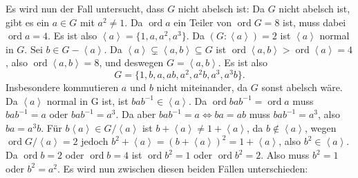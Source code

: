 \documentclass[a4paper,10pt]{article}
\theoremstyle{definition}
\newcommand{\ord}{\operatorname{ord}}
\newcommand{\gen}[1]{\left\langle#1\right\rangle}
\begin{document}
Es wird nun der Fall untersucht, dass $G$ nicht abelsch ist: Da $G$ nicht abelsch ist, gibt es ein $a \in G$ mit $a^2 \neq 1$. Da $\ord a$ ein Teiler von $\ord G = 8$ ist, muss dabei $\ord a = 4$. Es ist also $\gen{a} = \{1, a, a^2, a^3\}$. Da $(G : \gen{a}) = 2$ ist $\gen{a}$ normal in $G$. Sei $b \in G-\gen{a}$. Da $\gen{a} \subsetneq \gen{a,b} \subseteq G$ ist $\ord \gen{a,b} > \ord \gen{a} = 4$, also $\ord \gen{a,b} = 8$, und deswegen $G = \gen{a,b}$. Es ist also
\[
 G = \{1, b, a, ab, a^2, a^2 b, a^3, a^3 b\}.
\]
Insbesondere kommutieren $a$ und $b$ nicht miteinander, da $G$ sonst abelsch wäre. Da $\gen{a}$ normal in G ist, ist $bab^{-1} \in \gen{a}$. Da $\ord bab^{-1}  = \ord a$ muss $bab^{-1} = a$ oder $bab^{-1} = a^3$. Da aber $bab^{-1} = a \Leftrightarrow ba = ab$ muss $bab^{-1} = a^3$, also $ba = a^3 b$. Für $b\gen{a} \in G/\!\gen{a}$ ist $b+\gen{a} \neq 1+\gen{a}$, da $b \not\in \gen{a}$, wegen $\ord G/\!\gen{a} = 2$ jedoch $b^2 + \gen{a} = (b+\gen{a})^2 = 1+\gen{a}$, also $b^2 \in \gen{a}$. Da $\ord b = 2$ oder $\ord b = 4$ ist $\ord b^2 = 1$ oder $\ord b^2 = 2$. Also muss $b^2 = 1$ oder $b^2 = a^2$. Es wird nun zwischen diesen beiden Fällen unterschieden:
\end{document}
